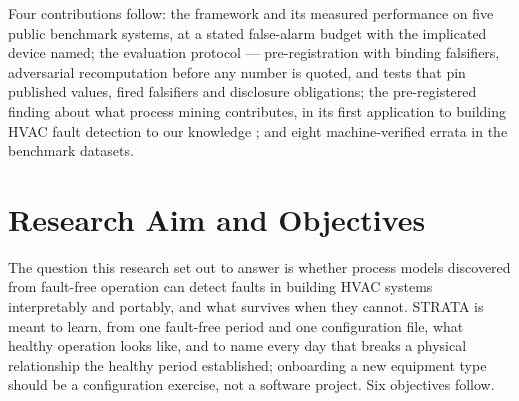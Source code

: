 \documentclass[11pt,letterpaper]{article}
\begin{document}
Four contributions follow: the framework and its measured performance on five public benchmark systems, at a stated false-alarm budget with the implicated device named; the evaluation protocol --- pre-registration with binding falsifiers, adversarial recomputation before any number is quoted, and tests that pin published values, fired falsifiers and disclosure obligations; the pre-registered finding about what process mining contributes, in its first application to building HVAC fault detection to our knowledge \cite{brzychczy2025pmsensorreview}; and eight machine-verified errata in the benchmark datasets.

\section{Research Aim and Objectives}
\label{sec:aims}

The question this research set out to answer is whether process models discovered from fault-free operation can detect faults in building HVAC systems interpretably and portably, and what survives when they cannot. STRATA is meant to learn, from one fault-free period and one configuration file, what healthy operation looks like, and to name every day that breaks a physical relationship the healthy period established; onboarding a new equipment type should be a configuration exercise, not a software project. Six objectives follow.
\end{document}
